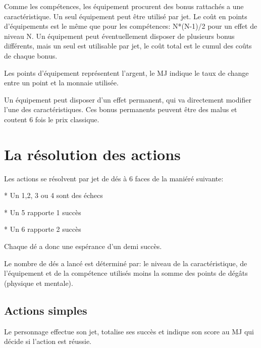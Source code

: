Comme les compétences, les équipement procurent des bonus rattachés a une caractéristique. Un seul équipement peut être utilisé par jet. Le coût en points d'équipements est le même que pour les compétences: N*(N-1)/2 pour un effet de niveau N. Un équipement peut éventuellement disposer de plusieurs bonus différents, mais un seul est utilisable par jet, le coût total est le cumul des coûts de chaque bonus. 

Les points d'équipement représentent l'argent, le MJ indique le taux de change entre un point et la monnaie utilisée.


Un équipement peut disposer d'un effet permanent, qui va directement modifier l'une des caractéristiques. Ces bonus permanents peuvent être des malus et coutent 6 fois le prix classique.


\section{La résolution des actions}
	
Les actions se résolvent par jet de dés à 6 faces de la maniéré suivante: 

* Un 1,2, 3 ou 4 sont des échecs

* Un 5 rapporte 1 succès

* Un 6 rapporte 2 succès
	
Chaque dé a donc une espérance d'un demi succès.
	
Le nombre de dés a lancé est déterminé par: le niveau de la caractéristique, de l’équipement et de la compétence utilisés moins la somme des points de dégâts (physique et mentale).
	
\subsection{Actions simples}
Le personnage effectue son jet, totalise ses succès et indique son score au MJ qui décide si l'action est réussie.
	

